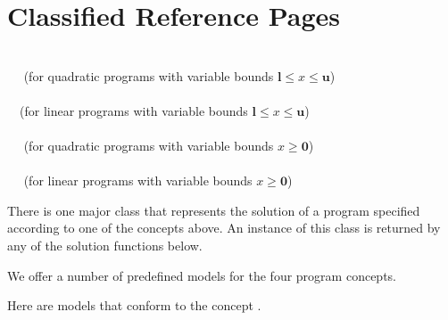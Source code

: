 \label{chapter:QPsolver}

\section{Classified Reference Pages}

\\
$\quad$ (for quadratic programs with variable bounds $\mathbf{l} \leq x \leq \mathbf{u}$) \\
 \\
$\quad$(for linear programs with variable bounds $\mathbf{l} \leq x \leq \mathbf{u}$)\\
\\
$\quad$ (for quadratic programs with variable bounds $x\geq\mathbf{0}$) \\
\\
$\quad$ (for linear programs with variable bounds $x\geq\mathbf{0}$)


There is one major class that represents the solution of a program
specified according to one of the concepts above. An instance of this 
class is returned by any of the solution functions below.


We offer a number of predefined models for the four program concepts.

Here are models that conform to the concept . 

